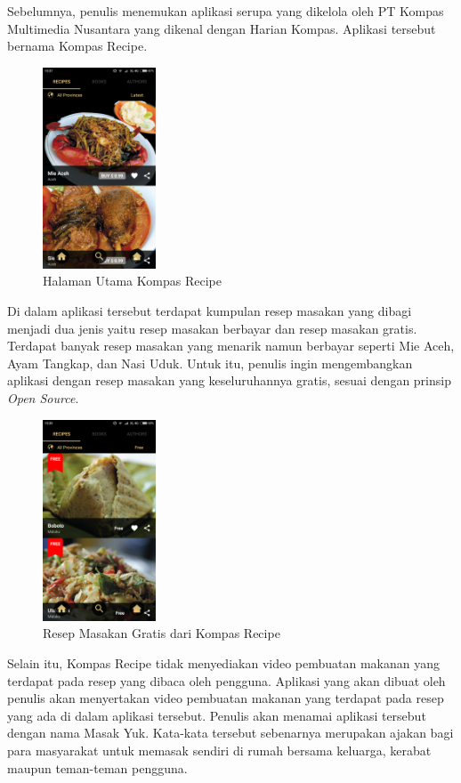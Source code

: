 Sebelumnya, penulis menemukan aplikasi serupa yang dikelola oleh PT Kompas Multimedia Nusantara yang dikenal dengan Harian Kompas. Aplikasi tersebut bernama Kompas Recipe. 
\begin{figure}[H]
	\centering
	\includegraphics[width=0.3\textwidth]{gambar/kompas/utama}
	\caption{Halaman Utama Kompas Recipe}
\end{figure} 
\vspace{1cm}
Di dalam aplikasi tersebut terdapat kumpulan resep masakan yang dibagi menjadi dua jenis yaitu resep masakan berbayar dan resep masakan gratis. Terdapat banyak resep masakan yang menarik namun berbayar seperti Mie Aceh, Ayam Tangkap, dan Nasi Uduk. Untuk itu, penulis ingin mengembangkan aplikasi dengan resep masakan yang keseluruhannya gratis, sesuai dengan prinsip \textit{Open Source}.
\begin{figure}[H]
	\centering
	\includegraphics[width=0.3\textwidth]{gambar/kompas/free}
	\caption{Resep Masakan Gratis dari Kompas Recipe}
\end{figure} 
 Selain itu, Kompas Recipe tidak menyediakan video pembuatan makanan yang terdapat pada resep yang dibaca oleh pengguna. Aplikasi yang akan dibuat oleh penulis akan menyertakan video pembuatan makanan yang terdapat pada resep yang ada di dalam aplikasi tersebut. Penulis akan menamai aplikasi tersebut dengan nama Masak Yuk. Kata-kata tersebut sebenarnya merupakan ajakan bagi para masyarakat untuk memasak sendiri di rumah bersama keluarga, kerabat maupun teman-teman pengguna.


